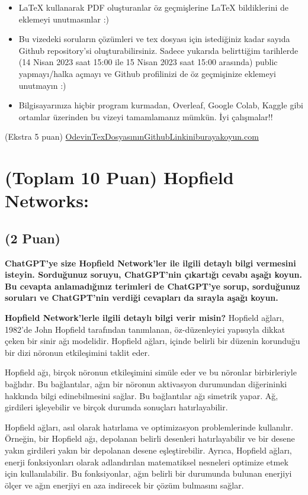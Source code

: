 \documentclass[11pt]{article}
\begin{document}
\begin{itemize}
    \item LaTeX kullanarak PDF oluşturanlar öz geçmişlerine LaTeX bildiklerini de eklemeyi unutmasınlar :)
    \item Bu vizedeki soruların çözümleri ve tex dosyası için istediğiniz kadar sayıda Github repository'si oluşturabilirsiniz. Sadece yukarıda belirttiğim tarihlerde (14 Nisan 2023 saat 15:00 ile 15 Nisan 2023 saat 15:00 arasında) public yapmayı/halka açmayı ve Github profilinizi de öz geçmişinize eklemeyi unutmayın :)
    \item Bilgisayarınıza hiçbir program kurmadan, Overleaf, Google Colab, Kaggle gibi ortamlar üzerinden bu vizeyi tamamlamanız mümkün. İyi çalışmalar!!
\end{itemize}

(Ekstra 5 puan) \url{OdevinTexDosyasınınGithubLinkiniburayakoyun.com}

\newpage
\section{(Toplam 10 Puan) Hopfield Networks:}

\subsection{(2 Puan)} \textbf{ChatGPT’ye size Hopfield Network’ler ile ilgili detaylı bilgi vermesini isteyin. Sorduğunuz soruyu, ChatGPT'nin çıkartığı cevabı aşağı koyun. Bu cevapta anlamadığınız terimleri de ChatGPT’ye sorup, sorduğunuz soruları ve ChatGPT’nin verdiği cevapları da sırayla aşağı koyun.}

\textbf{Hopfield Network'lerle ilgili detaylı bilgi verir misin?}
Hopfield ağları, 1982'de John Hopfield tarafından tanımlanan, öz-düzenleyici yapısıyla dikkat çeken bir sinir ağı modelidir. Hopfield ağları, içinde belirli bir düzenin korunduğu bir dizi nöronun etkileşimini taklit eder.

Hopfield ağı, birçok nöronun etkileşimini simüle eder ve bu nöronlar birbirleriyle bağlıdır. Bu bağlantılar, ağın bir nöronun aktivasyon durumundan diğerininki hakkında bilgi edinebilmesini sağlar. Bu bağlantılar ağı simetrik yapar. Ağ, girdileri işleyebilir ve birçok durumda sonuçları hatırlayabilir.

Hopfield ağları, asıl olarak hatırlama ve optimizasyon problemlerinde kullanılır. Örneğin, bir Hopfield ağı, depolanan belirli desenleri hatırlayabilir ve bir desene yakın girdileri yakın bir depolanan desene eşleştirebilir. Ayrıca, Hopfield ağları, enerji fonksiyonları olarak adlandırılan matematiksel nesneleri optimize etmek için kullanılabilir. Bu fonksiyonlar, ağın belirli bir durumunda bulunan enerjiyi ölçer ve ağın enerjiyi en aza indirecek bir çözüm bulmasını sağlar.
\end{document}
